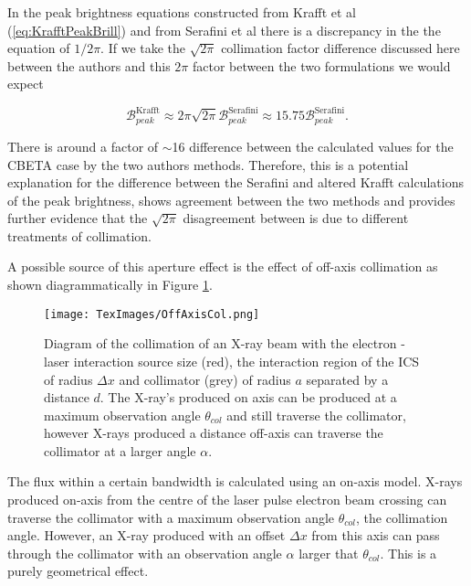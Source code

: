 \documentclass[10pt]{article}
\begin{document}
In the peak brightness equations constructed from Krafft et al (\ref{eq:KrafftPeakBrill}) and from Serafini et al \cite{curatolo2017analytical} there is a discrepancy in the the equation of $1/2\pi$.  If we take the $\sqrt{2\pi}$ collimation factor difference discussed here between the authors and this $2\pi$ factor between the two formulations we would expect

\begin{equation}
\mathcal{B}^{\mathrm{Krafft}}_{peak} \approx 2\pi\sqrt{2\pi}\mathcal{B}^{\mathrm{Serafini}}_{peak} \approx 15.75 \mathcal{B}^{\mathrm{Serafini}}_{peak}.
\label{eq:peakcomp}
\end{equation}

There is around a factor of $\sim$16 difference between the calculated values for the CBETA case by the two authors methods. Therefore, this is a potential explanation for the difference between the Serafini and altered Krafft calculations of the peak brightness, shows agreement between the two methods and provides further evidence that the $\sqrt{2\pi}$ disagreement between is due to different treatments of collimation.     
 

A possible source of this aperture effect is the effect of off-axis collimation as shown diagrammatically in Figure \ref{fig:offaxiscol}.

\begin{figure}[H]
\centering
\texttt{[image: TexImages/OffAxisCol.png]}
\caption{Diagram of the collimation of an X-ray beam with the electron - laser interaction source size (red), the interaction region of the ICS of radius $\Delta x$ and collimator (grey) of radius $a$ separated by a distance $d$. The X-ray's produced on axis can be produced at a maximum observation angle $\theta_{col}$ and still traverse the collimator, however X-rays produced a distance off-axis can traverse the collimator at a larger angle $\alpha$.}
\label{fig:offaxiscol}
\end{figure}

The flux within a certain bandwidth is calculated using an on-axis model. X-rays produced on-axis from the centre of the laser pulse electron beam crossing can traverse the collimator with a maximum observation angle $\theta_{col}$, the collimation angle. However, an X-ray produced with an offset $\Delta x$ from this axis can pass through the collimator with an observation angle $\alpha$ larger that $\theta_{col}$. This is a purely geometrical effect. 
\end{document}
